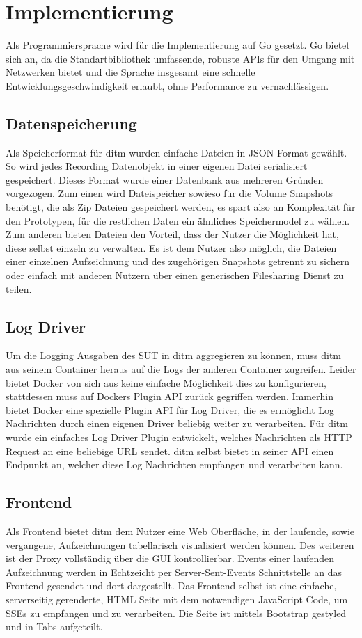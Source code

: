 \documentclass[12pt,a4paper]{report}
\begin{document}
\section{Implementierung}
Als Programmiersprache wird für die Implementierung auf Go gesetzt. Go bietet sich an, da die Standartbibliothek
umfassende, robuste APIs für den Umgang mit Netzwerken bietet und die Sprache insgesamt eine schnelle
Entwicklungsgeschwindigkeit erlaubt, ohne Performance zu vernachlässigen.
\subsection{Datenspeicherung}
Als Speicherformat für ditm wurden einfache Dateien in JSON Format gewählt. So wird jedes Recording Datenobjekt in
einer eigenen Datei serialisiert gespeichert. Dieses Format wurde einer Datenbank aus mehreren Gründen vorgezogen.
Zum einen wird Dateispeicher sowieso für die Volume Snapshots benötigt, die als Zip Dateien gespeichert werden,
es spart also an Komplexität für den Prototypen, für die restlichen Daten ein ähnliches Speichermodel zu wählen.
Zum anderen bieten Dateien den Vorteil, dass der Nutzer die Möglichkeit hat, diese selbst einzeln zu verwalten.
Es ist dem Nutzer also möglich, die Dateien einer einzelnen Aufzeichnung und des zugehörigen Snapshots getrennt
zu sichern oder einfach mit anderen Nutzern über einen generischen Filesharing Dienst zu teilen.
\subsection{Log Driver}
Um die Logging Ausgaben des SUT in ditm aggregieren zu können, muss ditm aus seinem Container heraus auf die Logs der
anderen Container zugreifen. Leider bietet Docker von sich aus keine einfache Möglichkeit dies zu konfigurieren,
stattdessen muss auf Dockers Plugin API zurück gegriffen werden. Immerhin bietet Docker eine spezielle Plugin API
für Log Driver, die es ermöglicht Log Nachrichten durch einen eigenen Driver beliebig weiter zu verarbeiten.
Für ditm wurde ein einfaches Log Driver Plugin entwickelt, welches Nachrichten als HTTP Request an eine beliebige URL
sendet. ditm selbst bietet in seiner API einen Endpunkt an, welcher diese Log Nachrichten empfangen und verarbeiten kann.
\subsection{Frontend}
Als Frontend bietet ditm dem Nutzer eine Web Oberfläche, in der laufende, sowie vergangene, Aufzeichnungen
tabellarisch visualisiert werden können. Des weiteren ist der Proxy vollständig über die GUI kontrollierbar.
Events einer laufenden Aufzeichnung werden in Echtzeicht per Server-Sent-Events Schnittstelle an das Frontend
gesendet und dort dargestellt.
Das Frontend selbst ist eine einfache, serverseitig gerenderte, HTML Seite mit dem notwendigen JavaScript Code,
um SSEs zu empfangen und zu verarbeiten. Die Seite ist mittels Bootstrap gestyled und in Tabs aufgeteilt.
\end{document}
